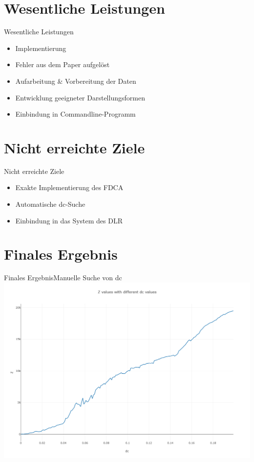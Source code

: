 \documentclass[12pt, xcolor={usenames,dvipsnames,svgnames,x11names,table}]{beamer}
\begin{document}
	
	\section{Wesentliche Leistungen}
	\begin{frame}{Wesentliche Leistungen}{}
		\begin{itemize}
			\item Implementierung %
			\item Fehler aus dem Paper aufgelöst %
			\item Aufarbeitung \& Vorbereitung der Daten
			\item Entwicklung geeigneter Darstellungsformen
			\item Einbindung in Commandline-Programm
		\end{itemize}		%
	\end{frame}
	

	\section{Nicht erreichte Ziele}
	\begin{frame}{Nicht erreichte Ziele}{}
		\begin{itemize}
			\item Exakte Implementierung des FDCA
			\item Automatische dc-Suche
			\item Einbindung in das System des DLR
		\end{itemize}
	\end{frame}
	
	
	\section{Finales Ergebnis}
	\begin{frame}{Finales Ergebnis}{Manuelle Suche von dc}
		\center\includegraphics[width=.9\textwidth]{twitter_z_dc_graph}
	\end{frame}
	
\end{document}
